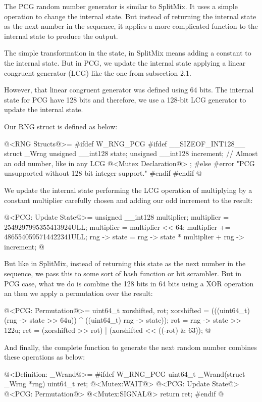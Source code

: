 
The PCG random number generator is similar to SplitMix. It uses a
simple operation to change the internal state. But instead of
returning the internal state as the next number in the sequence, it
applies a more complicated function to the internal state to produce
the output.

The simple transformation in the state, in SplitMix means adding a
constant to the internal state. But in PCG, we update the internal
state applying a linear congruent generator (LCG) like the one from
subsection 2.1.

However, that linear congruent generator was defined using 64
bits. The internal state for PCG have 128 bits and therefore, we use a
128-bit  LCG generator to update the internal state.

Our RNG struct is defined as below:

\iniciocodigo
@<RNG Structs@>=
#ifdef W_RNG_PCG
#ifdef __SIZEOF_INT128__
struct _Wrng{
  unsigned __int128 state;
  unsigned __int128 increment; // Almost an odd number, like in any LCG
  @<Mutex Declaration@>
};
#else
#error "PCG unsupported without 128 bit integer support."
#endif
#endif
@
\fimcodigo

We update the internal state performing the LCG operation of
multiplying by a constant multiplier carefully chosen and adding our
odd increment to the result:

\iniciocodigo
@<PCG: Update State@>=
{
  unsigned __int128 multiplier;
  multiplier = 2549297995355413924ULL;
  multiplier = multiplier << 64;
  multiplier += 4865540595714422341ULL;
  rng -> state = rng -> state * multiplier + rng -> increment;
}
@
\fimcodigo

But like in SplitMix, instead of returning this state as the next
number in the sequence, we pass this to some sort of hash function or
bit scrambler. But in PCG case, what we do is combine the 128 bits in
64 bits using a XOR operation an then we apply a permutation over the
result:

\iniciocodigo
@<PCG: Permutation@>=
{
  uint64_t xorshifted, rot;
  xorshifted = (((uint64_t)(rng -> state >> 64u)) ^ ((uint64_t) rng -> state));
  rot = rng -> state >> 122u;
  ret = (xorshifted >> rot) | (xorshifted << ((-rot) & 63));
}
@
\fimcodigo

And finally, the complete function to generate the next random number
combines these operations as below:

\iniciocodigo
@<Definition: \_Wrand@>=
#ifdef W_RNG_PCG
uint64_t _Wrand(struct _Wrng *rng){
  uint64_t ret;
  @<Mutex:WAIT@>
  @<PCG: Update State@>
  @<PCG: Permutation@>
  @<Mutex:SIGNAL@>
  return ret;
}
#endif
@
\fimcodigo

